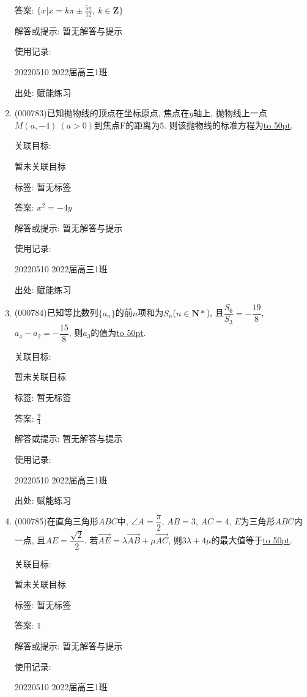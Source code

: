 \documentclass[10pt,a4paper]{article}
\newcommand{\blank}[1]{\underline{\hbox to #1pt{}}}
\begin{document}
\begin{enumerate}[1.]
答案: $\{x|x=k\pi \pm \frac{5\pi}{12},\ k\in \mathbf{Z}\}$

解答或提示: 暂无解答与提示

使用记录:

20220510	2022届高三1班	


出处: 赋能练习
\item { (000783)}已知抛物线的顶点在坐标原点, 焦点在$y$轴上, 抛物线上一点$M(a,-4) \ (a>0)$到焦点F的距离为$5$. 则该抛物线的标准方程为\blank{50}.


关联目标:

暂未关联目标



标签: 暂无标签

答案: $x^2=-4y$

解答或提示: 暂无解答与提示

使用记录:

20220510	2022届高三1班	


出处: 赋能练习
\item { (000784)}已知等比数列$\{a_n\}$的前$n$项和为$S_n$($n\in \mathbf{N}*$), 且$\dfrac{S_6}{S_3}=-\dfrac{19}8$,$a_4-a_2=-\dfrac{15}8$, 则$a_3$的值为\blank{50}.


关联目标:

暂未关联目标



标签: 暂无标签

答案: $\frac 94$

解答或提示: 暂无解答与提示

使用记录:

20220510	2022届高三1班	


出处: 赋能练习
\item { (000785)}在直角三角形$ABC$中, $\angle A=\dfrac{\pi}2$, $AB=3$, $AC=4$, $E$为三角形$ABC$内一点, 且$AE=\dfrac{\sqrt2}2$. 若$\overrightarrow{AE}=\lambda \overrightarrow{AB}+\mu \overrightarrow{AC}$, 则$3\lambda +4 \mu$的最大值等于\blank{50}.


关联目标:

暂未关联目标



标签: 暂无标签

答案: $1$

解答或提示: 暂无解答与提示

使用记录:

20220510	2022届高三1班	



\end{enumerate}
\end{document}
